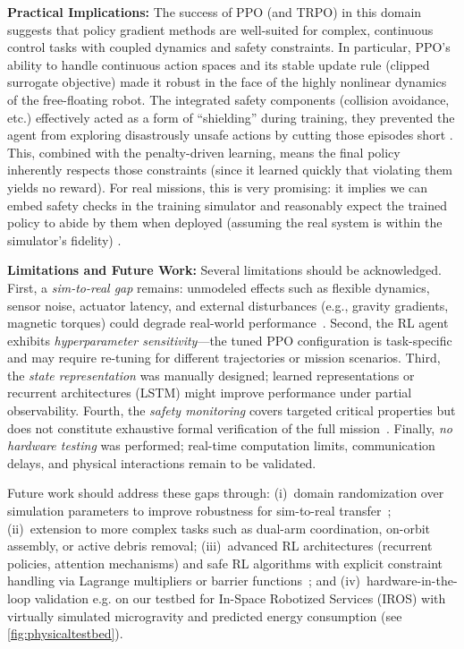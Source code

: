 \documentclass{ieeeaccess}
\begin{document}
\textbf{Practical Implications:} The success of PPO (and TRPO) in this domain suggests that policy gradient
methods are well-suited for complex, continuous control tasks with coupled dynamics and safety
constraints. In particular, PPO’s ability to handle continuous action spaces and its stable update rule
(clipped surrogate objective) made it robust in the face of the highly nonlinear dynamics of the free-floating robot. 
The integrated safety components (collision avoidance, etc.) effectively acted as a form of
“shielding” during training, they prevented the agent from exploring disastrously unsafe actions by
cutting those episodes short \cite{b15,b23,b22}. This, combined with the penalty-driven learning, means the final
policy inherently respects those constraints (since it learned quickly that violating them yields no
reward). For real missions, this is very promising: it implies we can embed safety checks in the training
simulator and reasonably expect the trained policy to abide by them when deployed (assuming the real
system is within the simulator’s fidelity) \cite{b22,b24}.


\textbf{Limitations and Future Work:}
Several limitations should be acknowledged. First, a \emph{sim-to-real gap} remains: unmodeled effects such as flexible dynamics, 
sensor noise, actuator latency, and external disturbances (e.g., gravity gradients, magnetic torques) could degrade real-world performance~\cite{b8,b22}. 
Second, the RL agent exhibits \emph{hyperparameter sensitivity}---the tuned PPO configuration is task-specific and may require re-tuning for different 
trajectories or mission scenarios. Third, the \emph{state representation} was manually designed; learned representations or recurrent architectures (LSTM) 
might improve performance under partial observability. Fourth, the \emph{safety monitoring} covers targeted critical properties but does not constitute 
exhaustive formal verification of the full mission~\cite{b5,b22}. Finally, \emph{no hardware testing} was performed; real-time computation limits, 
communication delays, and physical interactions remain to be validated.

Future work should address these gaps through: (i)~domain randomization over simulation parameters to improve robustness for sim-to-real 
transfer~\cite{b8}; (ii)~extension to more complex tasks such as dual-arm coordination, on-orbit assembly, or active debris removal; (iii)~advanced 
RL architectures (recurrent policies, attention mechanisms) and safe RL algorithms with explicit constraint handling via Lagrange multipliers 
or barrier functions~\cite{b22,b24,b23,b34}; and (iv)~hardware-in-the-loop  validation e.g. on our testbed for In-Space Robotized Services (IROS) with virtually simulated microgravity  and predicted energy consumption (see \cref{fig:physicaltestbed}).
\end{document}
